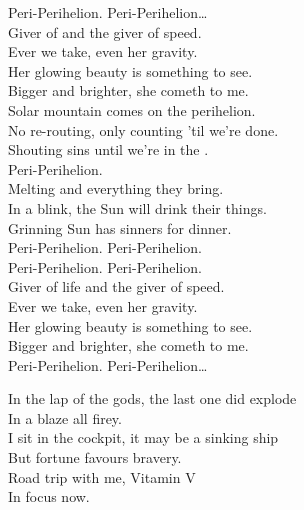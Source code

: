 Peri-Perihelion. Peri-Perihelion… \\

Giver of  and the giver of speed. \\
Ever we take, even her gravity. \\
Her glowing beauty is something to see. \\
Bigger and brighter, she cometh to me. \\

Solar mountain comes on the perihelion. \\
No re-routing, only counting 'til we're done. \\
Shouting sins until we're in the . \\
Peri-Perihelion. \\

Melting  and everything they bring. \\
In a blink, the Sun will drink their things. \\
Grinning Sun has sinners for dinner. \\

Peri-Perihelion. Peri-Perihelion. \\
Peri-Perihelion. Peri-Perihelion. \\

Giver of life and the giver of speed. \\
Ever we take, even her gravity. \\
Her glowing beauty is something to see. \\
Bigger and brighter, she cometh to me. \\

Peri-Perihelion. Peri-Perihelion… \\





In the lap of the gods, the last one did explode \\
In a blaze all firey. \\
I sit in the cockpit, it may be a sinking ship \\
But fortune favours bravery. \\

Road trip with me, Vitamin V \\
In focus now. \\

